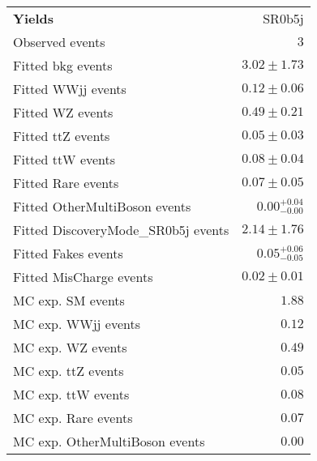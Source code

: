 \begin{table}
\begin{center}
\setlength{\tabcolsep}{0.0pc}
{\small
\begin{tabular*}{\textwidth}{@{\extracolsep{\fill}}lr}
\noalign{\smallskip}\hline\noalign{\smallskip}
{\bf Yields}           & SR0b5j              \\[-0.05cm]
\noalign{\smallskip}\hline\noalign{\smallskip}
Observed events          & $3$                    \\
\noalign{\smallskip}\hline\noalign{\smallskip}
Fitted bkg events         & $3.02 \pm 1.73$              \\
\noalign{\smallskip}\hline\noalign{\smallskip}
        Fitted WWjj events         & $0.12 \pm 0.06$              \\
        Fitted WZ events         & $0.49 \pm 0.21$              \\
        Fitted ttZ events         & $0.05 \pm 0.03$              \\
        Fitted ttW events         & $0.08 \pm 0.04$              \\
        Fitted Rare events         & $0.07 \pm 0.05$              \\
        Fitted OtherMultiBoson events         & $0.00_{-0.00}^{+0.04}$              \\
        Fitted DiscoveryMode\_SR0b5j events         & $2.14 \pm 1.76$              \\
        Fitted Fakes events         & $0.05_{-0.05}^{+0.06}$              \\
        Fitted MisCharge events         & $0.02 \pm 0.01$              \\
 \noalign{\smallskip}\hline\noalign{\smallskip}
MC exp. SM events              & $1.88$              \\
\noalign{\smallskip}\hline\noalign{\smallskip}
        MC exp. WWjj events         & $0.12$              \\
        MC exp. WZ events         & $0.49$              \\
        MC exp. ttZ events         & $0.05$              \\
        MC exp. ttW events         & $0.08$              \\
        MC exp. Rare events         & $0.07$              \\
        MC exp. OtherMultiBoson events         & $0.00$              \\

\end{tabular*}}
\end{center}
\end{table}
